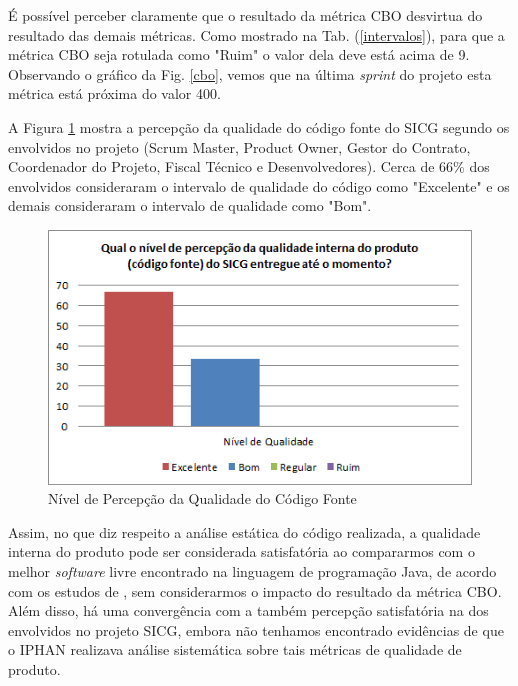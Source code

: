 É possível perceber claramente que o resultado da métrica CBO desvirtua do resultado das demais métricas. Como mostrado na Tab. (\ref{intervalos}), para que a métrica CBO seja rotulada como "Ruim" o valor dela deve está acima de 9. Observando o gráfico da Fig. \ref{cbo}, vemos que na última \textit{sprint} do projeto esta métrica está próxima do valor 400.

A Figura \ref{percepcaoqualidade} mostra a percepção da qualidade do código fonte do SICG segundo os envolvidos no projeto (Scrum Master, Product Owner, Gestor do Contrato, Coordenador do Projeto, Fiscal Técnico e Desenvolvedores). Cerca de 66\% dos envolvidos consideraram  o intervalo de qualidade do código como "Excelente" e os demais consideraram
o intervalo de qualidade como "Bom".

\begin{figure}[H]
		\centering
			\includegraphics[scale=1.0]{figuras/percepcaoqualidade.png}
		\caption{Nível de Percepção da Qualidade do Código Fonte}
		\label{percepcaoqualidade}
\end{figure}

Assim, no que diz respeito a análise estática do código realizada, a qualidade interna do produto pode ser considerada satisfatória ao compararmos com o melhor \textit{software} livre encontrado na linguagem de programação Java, de acordo com os estudos de , sem considerarmos o impacto do resultado da métrica CBO. Além disso, há uma convergência com a também percepção satisfatória na dos envolvidos no projeto SICG, embora não tenhamos encontrado evidências de que o IPHAN realizava análise sistemática sobre tais métricas de qualidade de produto.

